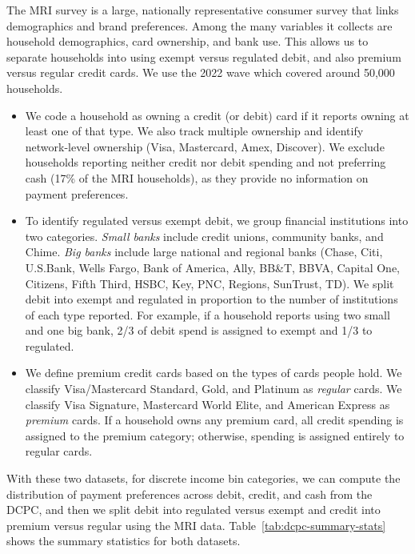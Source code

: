 \documentclass[11pt,english]{article}
\theoremstyle{remark}
\begin{document}
The MRI survey is a large, nationally representative consumer survey that links demographics and brand preferences.
Among the many variables it collects are household demographics, card ownership, and bank use.
This allows us to separate households into using exempt versus regulated debit, and also premium versus regular credit cards.
We use the 2022 wave which covered around 50,000 households.

\begin{itemize}
    \item We code a household as owning a credit (or debit) card if it reports owning at least one of that type. We also track multiple ownership and identify network-level ownership (Visa, Mastercard, Amex, Discover). We exclude households reporting neither credit nor debit spending and not preferring cash (17\% of the MRI households), as they provide no information on payment preferences.
    \item To identify regulated versus exempt debit, we group financial institutions into two categories. \emph{Small banks} include credit unions, community banks, and Chime. \emph{Big banks} include large national and regional banks (Chase, Citi, U.S.Bank, Wells Fargo, Bank of America, Ally, BB\&T, BBVA, Capital One, Citizens, Fifth Third, HSBC, Key, PNC, Regions, SunTrust, TD). We split debit into exempt and regulated in proportion to the number of institutions of each type reported. For example, if a household reports using two small and one big bank, 2/3 of debit spend is assigned to exempt and 1/3 to regulated.
    \item We define premium credit cards based on the types of cards people hold. We classify Visa/Mastercard Standard, Gold, and Platinum as \emph{regular} cards. We classify Visa Signature, Mastercard World Elite, and American Express as \emph{premium} cards. If a household owns any premium card, all credit spending is assigned to the premium category; otherwise, spending is assigned entirely to regular cards.
\end{itemize}

With these two datasets, for discrete income bin categories, we can compute the distribution of payment preferences across debit, credit, and cash from the DCPC, and then we split debit into regulated versus exempt and credit into premium versus regular using the MRI data.
Table~\ref{tab:dcpc-summary-stats} shows the summary statistics for both datasets.
\end{document}
